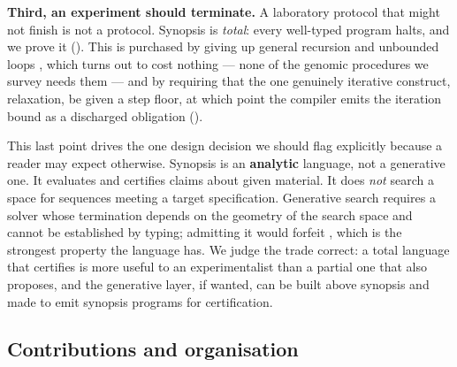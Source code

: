 \documentclass[11pt,twocolumn,a4paper]{article}
\theoremstyle{plain}
\theoremstyle{definition}
\theoremstyle{remark}
\begin{document}
\textbf{Third, an experiment should terminate.} A laboratory protocol
that might not finish is not a protocol. Synopsis is \emph{total}: every
well-typed program halts, and we prove it (). This is
purchased by giving up general recursion and unbounded loops
\cite{turner1995total}, which turns out to cost nothing --- none of the
genomic procedures we survey needs them --- and by requiring that the
one genuinely iterative construct, relaxation, be given a step floor, at
which point the compiler emits the iteration bound as a discharged
obligation ().

This last point drives the one design decision we should flag explicitly
because a reader may expect otherwise. Synopsis is an \textbf{analytic}
language, not a generative one. It evaluates and certifies claims about
given material. It does \emph{not} search a space for sequences meeting a
target specification. Generative search requires a solver whose
termination depends on the geometry of the search space and cannot be
established by typing; admitting it would forfeit ,
which is the strongest property the language has. We judge the trade
correct: a total language that certifies is more useful to an
experimentalist than a partial one that also proposes, and the
generative layer, if wanted, can be built above synopsis and made to
emit synopsis programs for certification.

\subsection{Contributions and organisation}
\end{document}
